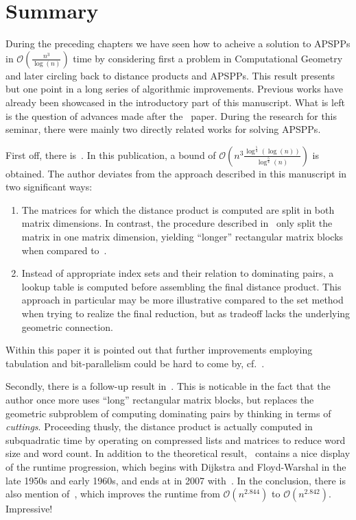 \chapter{Summary}

During the preceding chapters we have seen how to acheive a solution to APSPPs in $\mathcal{O}\left( \frac{n^3}{\log(n)} \right)$ time by considering first a problem in Computational Geometry and later circling back to distance products and APSPPs.
This result presents but one point in a long series of algorithmic improvements.
Previous works have already been showcased in the introductory part of this manuscript.
What is left is the question of advances made after the~\cite{Chan2007} paper.
During the research for this seminar, there were mainly two directly related works for solving APSPPs.

First off, there is~\cite{Han2008}.
In this publication, a bound of $\mathcal{O}\left( n^3 {\frac{\log^{\frac{5}{4}}(\log(n))}{\log^{\frac{5}{4}}(n)}} \right)$ is obtained.
The author deviates from the approach described in this manuscript in two significant ways:
\begin{enumerate}
    \item %
        The matrices for which the distance product is computed are split in both matrix dimensions.
        In contrast, the procedure described in~\cite{Chan2007} only split the matrix in one matrix dimension, yielding ``longer'' rectangular matrix blocks when compared to~\cite{Han2008}.
    \item %
        Instead of appropriate index sets and their relation to dominating pairs, a lookup table is computed before assembling the final distance product.
        This approach in particular may be more illustrative compared to the set method when trying to realize the final reduction, but as tradeoff lacks the underlying geometric connection.
\end{enumerate}
Within this paper it is pointed out that further improvements employing tabulation and bit-parallelism could be hard to come by, cf.~\cite[Section~6]{Han2008}.

Secondly, there is a follow-up result in~\cite{Chan2010}.
This is noticable in the fact that the author once more uses ``long'' rectangular matrix blocks, but replaces the geometric subproblem of computing dominating pairs by thinking in terms of \emph{cuttings}.
Proceeding thusly, the distance product is actually computed in subquadratic time by operating on compressed lists and matrices to reduce word size and word count.
In addition to the theoretical result,\ \cite[Table~1.1]{Chan2010} contains a nice display of the runtime progression, which begins with Dijkstra and Floyd-Warshal in the late 1950s and early 1960s, and ends at in 2007 with~\cite{Chan2010}.
In the conclusion, there is also mention of~\cite{Yuster2009}, which improves the runtime from $\mathcal{O}\left( n^{2.844} \right)$ to $\mathcal{O}\left( n^{2.842} \right)$.
Impressive!

